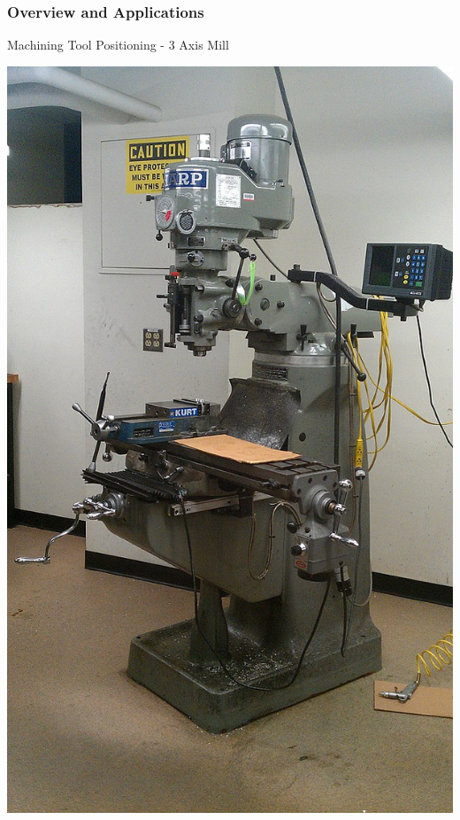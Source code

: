 \documentclass[fleqn]{beamer} %
\newcommand{\sectiontitleI}{Overview and Applications}
\begin{document}
\begin{frame}[label=sectionI]
\begin{multicols}{2}
		\end{multicols}

	\end{frame}

	\begin{frame}[label=sectionI] \small
		\frametitle{\sectiontitleI}	
		Machining Tool Positioning - 3 Axis Mill

		\begin{multicols}{3}
			\includegraphics[scale=0.15]{images/Sharp_3_Axis_Vertical_Mill_Full_View.jpeg}


\end{multicols}
\end{frame}
\end{document}
